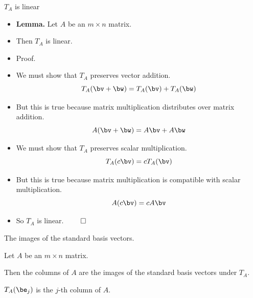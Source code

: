 \documentclass{beamer}
\begin{document}
\begin{frame}{$T_A$ is linear}

\begin{itemize}
\item \textbf{Lemma.} Let $A$ be an $m\times n$ matrix.
\item Then $T_A$ is linear.
\item Proof.
\item We must show that $T_A$ preserves vector addition.
$$T_A(\bv + \bw) = T_A(\bv) + T_A(\bw)$$
\item But this is true because matrix multiplication distributes over matrix addition.
$$A(\bv + \bw) = A\bv + A\bw$$
\item We must show that $T_A$ preserves scalar multiplication.
$$T_A(c \bv) = c T_A(\bv)$$
\item But this is true because matrix multiplication is compatible with scalar multiplication.
$$A(c \bv ) = c A\bv$$
\item So $T_A$ is linear. $\qed$
\end{itemize}
\end{frame}

\beamerdefaultoverlayspecification{}

\begin{frame}{The images of the standard basis vectors.}

\begin{lemma}
Let $A$ be an $m\times n$ matrix.

\pause

\bigskip

Then the columns of $A$ are the
images of the standard basis vectors under $T_A$.

\bigskip


\pause

$T_A(\be_j)$ is the $j$-th column of $A$.
\end{lemma}
\end{frame}

\end{document}
